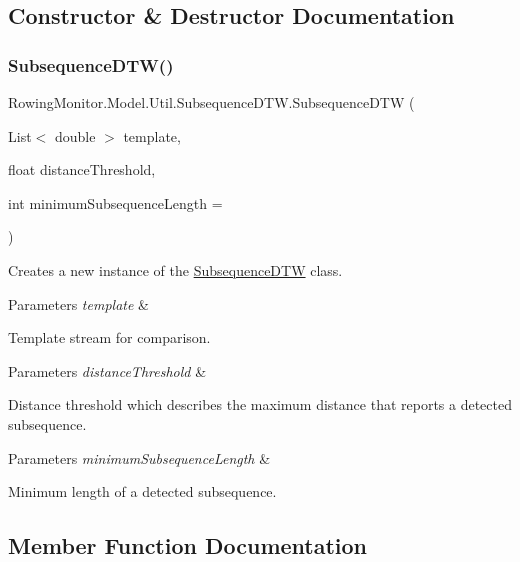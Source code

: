 \subsection{Constructor \& Destructor Documentation}
\mbox{\label{class_rowing_monitor_1_1_model_1_1_util_1_1_subsequence_d_t_w_a16ee898f6e11aee3d1b3ccfb482cdddb}} 
\subsubsection{\texorpdfstring{Subsequence\+D\+T\+W()}{SubsequenceDTW()}}
{\footnotesize\ttfamily Rowing\+Monitor.\+Model.\+Util.\+Subsequence\+D\+T\+W.\+Subsequence\+D\+TW (\begin{DoxyParamCaption}\item[{List$<$ double $>$}]{template,  }\item[{float}]{distance\+Threshold,  }\item[{int}]{minimum\+Subsequence\+Length = {} }\end{DoxyParamCaption})}



Creates a new instance of the \hyperlink{class_rowing_monitor_1_1_model_1_1_util_1_1_subsequence_d_t_w}{Subsequence\+D\+TW} class. 


\begin{DoxyParams}{Parameters}
{\em template} & \\
\hline
\end{DoxyParams}
Template stream for comparison. 
\begin{DoxyParams}{Parameters}
{\em distance\+Threshold} & \\
\hline
\end{DoxyParams}
Distance threshold which describes the maximum distance that reports a detected subsequence. 
\begin{DoxyParams}{Parameters}
{\em minimum\+Subsequence\+Length} & \\
\hline
\end{DoxyParams}
Minimum length of a detected subsequence. 

\subsection{Member Function Documentation}
\mbox{\label{class_rowing_monitor_1_1_model_1_1_util_1_1_subsequence_d_t_w_a2aa9afce49cbb11a86ee3e5791397416}} 

